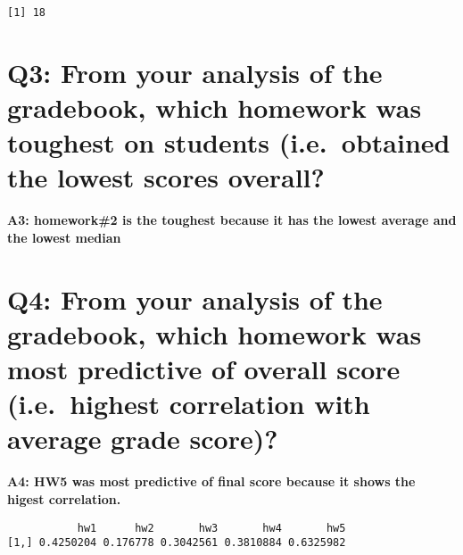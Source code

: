 \documentclass[
  letterpaper,
  DIV=11,
  numbers=noendperiod]{scrartcl}
\newenvironment{Shaded}{\begin{snugshade}}{\end{snugshade}}
\newcommand{\AttributeTok}[1]{\textcolor[rgb]{0.40,0.45,0.13}{#1}}
\newcommand{\CommentTok}[1]{\textcolor[rgb]{0.37,0.37,0.37}{#1}}
\newcommand{\DecValTok}[1]{\textcolor[rgb]{0.68,0.00,0.00}{#1}}
\newcommand{\FunctionTok}[1]{\textcolor[rgb]{0.28,0.35,0.67}{#1}}
\newcommand{\NormalTok}[1]{\textcolor[rgb]{0.00,0.23,0.31}{#1}}
\newcommand{\OtherTok}[1]{\textcolor[rgb]{0.00,0.23,0.31}{#1}}
\newcommand{\SpecialCharTok}[1]{\textcolor[rgb]{0.37,0.37,0.37}{#1}}
\begin{document}
\begin{verbatim}
[1] 18
\end{verbatim}

\hypertarget{q3-from-your-analysis-of-the-gradebook-which-homework-was-toughest-on-students-i.e.-obtained-the-lowest-scores-overall}{%
\section{Q3: From your analysis of the gradebook, which homework was
toughest on students (i.e.~obtained the lowest scores
overall?}\label{q3-from-your-analysis-of-the-gradebook-which-homework-was-toughest-on-students-i.e.-obtained-the-lowest-scores-overall}}

\textbf{A3: homework\#2 is the toughest because it has the lowest
average and the lowest median}

\hypertarget{q4-from-your-analysis-of-the-gradebook-which-homework-was-most-predictive-of-overall-score-i.e.-highest-correlation-with-average-grade-score}{%
\section{Q4: From your analysis of the gradebook, which homework was
most predictive of overall score (i.e.~highest correlation with average
grade
score)?}\label{q4-from-your-analysis-of-the-gradebook-which-homework-was-most-predictive-of-overall-score-i.e.-highest-correlation-with-average-grade-score}}

\textbf{A4: HW5 was most predictive of final score because it shows the
higest correlation.}

\begin{Shaded}
\end{Shaded}

\begin{verbatim}
           hw1      hw2       hw3       hw4       hw5
[1,] 0.4250204 0.176778 0.3042561 0.3810884 0.6325982
\end{verbatim}

\begin{Shaded}
\end{Shaded}
\end{document}
